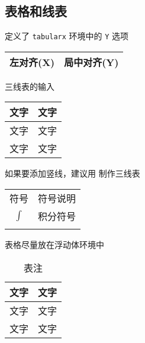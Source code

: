 \documentclass{JXUSTmodeling}
\begin{document}
\subsection{表格和线表}
定义了 \texttt{tabularx} 环境中的 \texttt{Y} 选项
\begin{hexample}
\begin{tabularx}{\textwidth}{XY}
  \hline
  左对齐(X) & 局中对齐(Y)\\
  \hline
\end{tabularx}
\end{hexample}

三线表的输入
\begin{hexample}
\begin{tabularx}{\textwidth}{YY}
  \toprule
  文字 & 文字\\
  \midrule
  文字 & 文字\\
  文字 & 文字\\
  \bottomrule
\end{tabularx}
\end{hexample}
如果要添加竖线，建议用 \texttt{} 制作三线表
\begin{hexample}
\begin{tabularx}{\textwidth}{  c   @{\hspace{1pc}}  |  @{\hspace{1pc}}   Y   }
  \Xhline{0.08em}
  符号 & 符号说明\\
  \Xhline{0.05em}
  $\int$ & 积分符号\\
  \Xhline{0.08em}
\end{tabularx}
\end{hexample}
表格尽量放在浮动体环境中
\begin{floatexample}
\begin{table}[htbp]
  \centering
  \caption{表注}\label{tab:example}
  \begin{tabularx}{\textwidth}{YY}
    \toprule %
    文字 & 文字\\
    \midrule %
    文字 & 文字\\
    文字 & 文字\\
    \bottomrule %
  \end{tabularx}
\end{table}
\end{floatexample}
\end{document}
